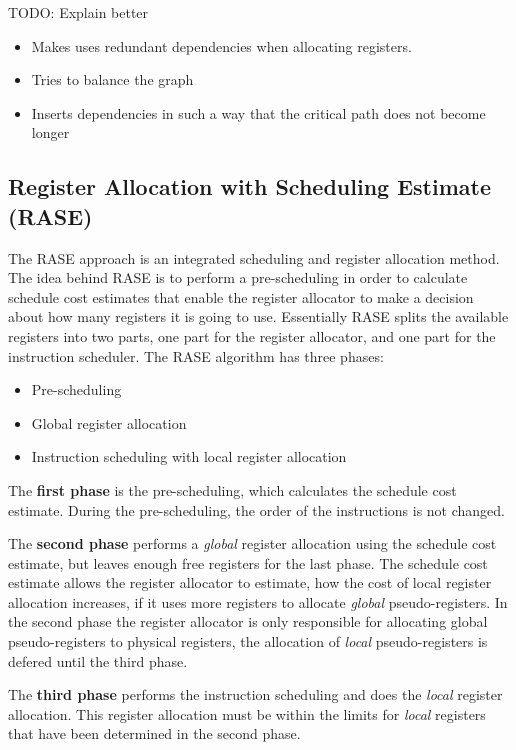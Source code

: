 \documentclass[a4paper,10pt]{article}
\begin{document}
TODO: Explain better
 \begin{itemize}
  \item Makes uses redundant dependencies when allocating registers.
  \item Tries to balance the graph
  \item Inserts dependencies in such a way that the critical path does not become longer
 \end{itemize}



\subsection{Register Allocation with Scheduling Estimate (RASE)}
The RASE approach is an integrated scheduling and register allocation method. The idea behind RASE is to perform a pre-scheduling in order 
to calculate schedule cost estimates that enable the register allocator to make a decision about how many registers it is going to use. 
Essentially RASE splits the available registers into two parts, one part for the register allocator, and one part for the instruction 
scheduler. The RASE algorithm has three phases:
\begin{itemize}
 \item Pre-scheduling
 \item Global register allocation
 \item Instruction scheduling with local register allocation
\end{itemize}

The \textbf{first phase} is the pre-scheduling, which calculates the schedule cost estimate. During the pre-scheduling, the order of the 
instructions is not changed.

The \textbf{second phase} performs a \textit{global} register allocation using the schedule cost estimate, but leaves enough free 
registers for the last phase. The schedule cost estimate allows the register allocator to estimate, how the cost of local register 
allocation increases, if it uses more registers to allocate \textit{global} pseudo-registers. In the second phase the register allocator 
is only responsible for allocating global pseudo-registers to physical registers, the allocation of \textit{local} pseudo-registers is 
defered until the third phase.

The \textbf{third phase} performs the instruction scheduling and does the \textit{local} register allocation.  This register allocation 
must be within the limits for \textit{local} registers that have been determined in the second phase.
\end{document}
